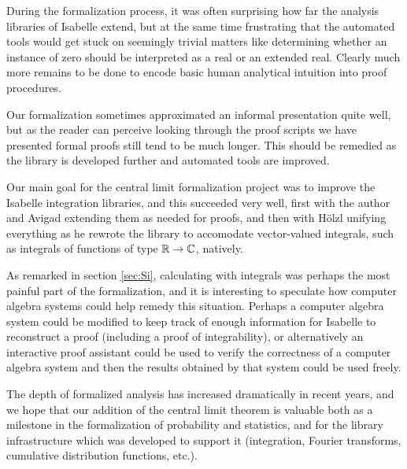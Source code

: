 \documentclass[leqno]{article}
\theoremstyle{definition}
\begin{document}
During the formalization process, it was often surprising how far the analysis libraries of Isabelle extend, but at the same time frustrating that the automated tools would get stuck on seemingly trivial matters like determining whether an instance of zero should be interpreted as a real or an extended real. Clearly much more remains to be done to encode basic human analytical intuition into proof procedures.

Our formalization sometimes approximated an informal presentation quite well, but as the reader can perceive looking through the proof scripts we have presented formal proofs still tend to be much longer. This should be remedied as the library is developed further and automated tools are improved.

Our main goal for the central limit formalization project was to improve the Isabelle integration libraries, and this succeeded very well, first with the author and Avigad extending them as needed for proofs, and then with H\"olzl unifying everything as he rewrote the library to accomodate vector-valued integrals, such as integrals of functions of type $\mathbb{R} \rightarrow \mathbb{C}$, natively.

As remarked in section \ref{sec:Si}, calculating with integrals was perhaps the most painful part of the formalization, and it is interesting to speculate how computer algebra systems could help remedy this situation. Perhaps a computer algebra system could be modified to keep track of enough information for Isabelle to reconstruct a proof (including a proof of integrability), or alternatively an interactive proof assistant could be used to verify the correctness of a computer algebra system and then the results obtained by that system could be used freely.

The depth of formalized analysis has increased dramatically in recent years, and we hope that our addition of the central limit theorem is valuable both as a milestone in the formalization of probability and statistics, and for the library infrastructure which was developed to support it (integration, Fourier transforms, cumulative distribution functions, etc.).



\end{document}
